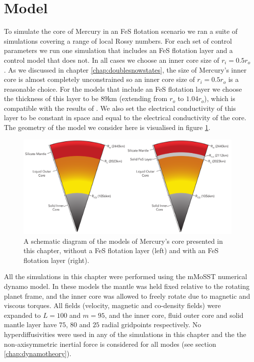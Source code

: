\section{Model}
\label{sec:fesmodel}
To simulate the core of Mercury in an FeS flotation scenario we ran a suite of simulations covering a range of local Rossy numbers. For each set of control parameters we run one simulation that includes an FeS flotation layer and a control model that does not. In all cases we choose an inner core size of $r_i=0.5r_o$. As we discussed in chapter \ref{chap:doublesnowstates}, the size of Mercury's inner core is almost completely unconstrained so an inner core size of $r_i=0.5r_o$ is a reasonable choice. For the models that include an FeS flotation layer we choose the thickness of this layer to be $89$km (extending from $r_o$ to $1.04r_o$), which is compatible with the results of \citet{hauck2013}. We also set the electrical conductivity of this layer to be constant in space and equal to the electrical conductivity of the core. The geometry of the model we consider here is visualised in figure \ref{fig:FeSSchematic}.
\begin{figure}
	\centering
        \includegraphics[width=\textwidth]{Chapter5/Figures/Structure.pdf}
        \caption{A schematic diagram of the models of Mercury's core presented in this chapter, without a FeS flotation layer (left) and with an FeS flotation layer (right).}
        \label{fig:FeSSchematic}
\end{figure}

All the simulations in this chapter were performed using the mMoSST numerical dynamo model. In these models the mantle was held fixed relative to the rotating planet frame, and the inner core was allowed to freely rotate due to magnetic and viscous torques. All fields (velocity, magnetic and co-density fields) were expanded to $L=100$ and $m=95$, and the inner core, fluid outer core and solid mantle layer have $75$, $80$ and $25$ radial gridpoints respectively. No hyperdiffusivities were used in any of the simulations in this chapter and the the non-axisymmetric inertial force is considered for all modes (see section \ref{chap:dynamotheory}).

